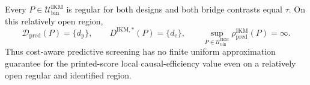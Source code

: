 Every \(P\in\mathcal U_{\mathrm{bin}}^{\mathrm{IKM}}\) is regular for both designs and both bridge contrasts equal \(\tau\). On this relatively open region,
\[
 \mathcal D_{\mathrm{pred}}(P)=\{d_{\mathrm p}\},
 \qquad
 D^{\mathrm{IKM},*}(P)=\{d_{\mathrm e}\},
 \qquad
 \sup_{P\in\mathcal U_{\mathrm{bin}}^{\mathrm{IKM}}}
 \rho_{\mathrm{pred}}^{\mathrm{IKM}}(P)=\infty.
\]
Thus cost-aware predictive screening has no finite uniform approximation guarantee for the printed-score local causal-efficiency value even on a relatively open regular and identified region.